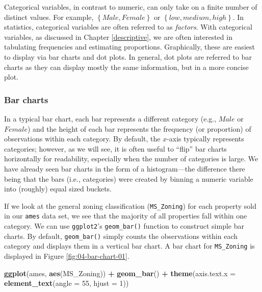 \documentclass[]{book}
\newenvironment{Shaded}{\begin{snugshade}}{\end{snugshade}}
\newcommand{\DataTypeTok}[1]{\textcolor[rgb]{0.13,0.29,0.53}{#1}}
\newcommand{\DecValTok}[1]{\textcolor[rgb]{0.00,0.00,0.81}{#1}}
\newcommand{\KeywordTok}[1]{\textcolor[rgb]{0.13,0.29,0.53}{\textbf{#1}}}
\newcommand{\NormalTok}[1]{#1}
\newcommand{\OperatorTok}[1]{\textcolor[rgb]{0.81,0.36,0.00}{\textbf{#1}}}
\newcommand{\StringTok}[1]{\textcolor[rgb]{0.31,0.60,0.02}{#1}}
\theoremstyle{definition}
\theoremstyle{definition}
\theoremstyle{definition}
\theoremstyle{remark}
\begin{document}
Categorical variables, in contrast to numeric, can only take on a finite
number of distinct values. For example, \(\left\{Male, Female\right\}\)
or \(\left\{low, medium, high\right\}\). In statistics, categorical
variables are often referred to as \emph{factors}. With categorical
variables, as discussed in Chapter \ref{descriptive}, we are often
interested in tabulating frequencies and estimating proportions.
Graphically, these are easiest to display via bar charts and dot plots.
In general, dot plots are referred to bar charts as they can display
mostly the same information, but in a more concise plot.

\hypertarget{bar-charts}{%
\subsubsection{Bar charts}\label{bar-charts}}

In a typical bar chart, each bar represents a different category (e.g.,
\(Male\) or \(Female\)) and the height of each bar represents the
frequency (or proportion) of observations within each category. By
default, the \(x\)-axis typically represents categories; however, as we
will see, it is often useful to ``flip'' bar charts horizontally for
readability, especially when the number of categories is large. We have
already seen bar charts in the form of a histogram---the difference
there being that the bars (i.e., categories) were created by binning a
numeric variable into (roughly) equal sized buckets.

If we look at the general zoning classification (\texttt{MS\_Zoning})
for each property sold in our \texttt{ames} data set, we see that the
majority of all properties fall within one category. We can use
\texttt{ggplot2}'s \texttt{geom\_bar()} function to construct simple bar
charts. By default, \texttt{geom\_bar()} simply counts the observations
within each category and displays them in a vertical bar chart. A bar
chart for \texttt{MS\_Zoning} is displayed in Figure
\ref{fig:04-bar-chart-01}.

\begin{Shaded}
\begin{Highlighting}[]
\KeywordTok{ggplot}\NormalTok{(ames, }\KeywordTok{aes}\NormalTok{(MS_Zoning)) }\OperatorTok{+}
\StringTok{  }\KeywordTok{geom_bar}\NormalTok{() }\OperatorTok{+}\StringTok{ }
\StringTok{  }\KeywordTok{theme}\NormalTok{(}\DataTypeTok{axis.text.x =} \KeywordTok{element_text}\NormalTok{(}\DataTypeTok{angle =} \DecValTok{55}\NormalTok{, }\DataTypeTok{hjust =} \DecValTok{1}\NormalTok{))}
\end{Highlighting}
\end{Shaded}
\end{document}
